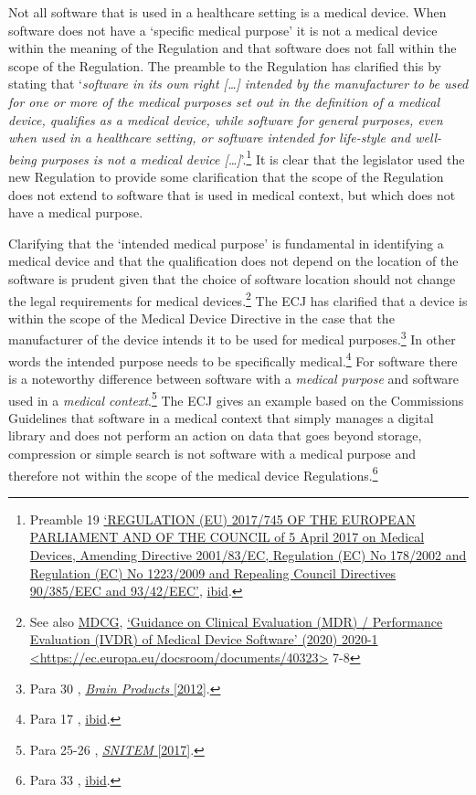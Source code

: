 \documentclass[
]{scrartcl}
\begin{document}
Not all software that is used in a healthcare setting is a medical device. When software does not have a `specific medical purpose' it is not a medical device within the meaning of the Regulation and that software does not fall within the scope of the Regulation. The preamble to the Regulation has clarified this by stating that `\emph{software in its own right {[}\ldots{]} intended by the manufacturer to be used for one or more of the medical purposes set out in the definition of a medical device, qualifies as a medical device, while software for general purposes, even when used in a healthcare setting, or software intended for life-style and well-being purposes is not a medical device {[}\ldots{]}}'.\footnote{Preamble 19 \protect\hyperlink{ref-REGULATIONEU2017a}{{`{REGULATION} ({EU}) 2017/745 {OF THE EUROPEAN PARLIAMENT AND OF THE COUNCIL} of 5 {April} 2017 on Medical Devices, Amending {Directive} 2001/83/{EC}, {Regulation} ({EC}) {No} 178/2002 and {Regulation} ({EC}) {No} 1223/2009 and Repealing {Council Directives} 90/385/{EEC} and 93/42/{EEC}'}}, \protect\hyperlink{ref-REGULATIONEU2017a}{ibid}.} It is clear that the legislator used the new Regulation to provide some clarification that the scope of the Regulation does not extend to software that is used in medical context, but which does not have a medical purpose.

Clarifying that the `intended medical purpose' is fundamental in identifying a medical device and that the qualification does not depend on the location of the software is prudent given that the choice of software location should not change the legal requirements for medical devices.\footnote{See also \protect\hyperlink{ref-mdcgGuidanceClinicalEvaluation2020}{MDCG}, \protect\hyperlink{ref-mdcgGuidanceClinicalEvaluation2020}{{`Guidance on {Clinical Evaluation} ({MDR}) / {Performance Evaluation} ({IVDR}) of {Medical Device Software}'} (2020) 2020-1 \textless{}\url{https://ec.europa.eu/docsroom/documents/40323}\textgreater{}} 7-8} The ECJ has clarified that a device is within the scope of the Medical Device Directive in the case that the manufacturer of the device intends it to be used for medical purposes.\footnote{Para 30 , \protect\hyperlink{ref-BrainProducts2012}{\emph{Brain {Products}} {[}2012{]}}.} In other words the intended purpose needs to be specifically medical.\footnote{Para 17 , \protect\hyperlink{ref-BrainProducts2012}{ibid}.} For software there is a noteworthy difference between software with a \emph{medical purpose} and software used in a \emph{medical context}.\footnote{Para 25-26 , \protect\hyperlink{ref-SNITEM2017}{\emph{{SNITEM}} {[}2017{]}}.} The ECJ gives an example based on the Commissions Guidelines that software in a medical context that simply manages a digital library and does not perform an action on data that goes beyond storage, compression or simple search is not software with a medical purpose and therefore not within the scope of the medical device Regulations.\footnote{Para 33 , \protect\hyperlink{ref-SNITEM2017}{ibid}.}
\end{document}
